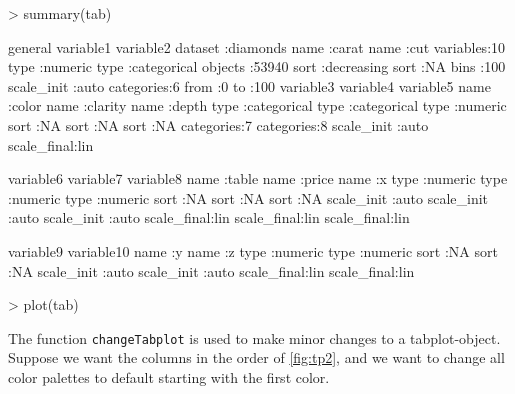 \documentclass[11pt, fleqn, a4paper]{article}
\begin{document}
\begin{Schunk}
\begin{Sinput}
> summary(tab)
\end{Sinput}
\begin{Soutput}
      general               variable1               variable2          
 dataset  :diamonds   name       :carat        name      :cut          
 variables:10         type       :numeric      type      :categorical  
 objects  :53940      sort       :decreasing   sort      :NA           
 bins     :100        scale_init :auto         categories:6            
 from     :0%         scale_final:lin                                  
 to       :100%                                                        
      variable3                variable4                 variable5      
 name      :color         name      :clarity       name       :depth    
 type      :categorical   type      :categorical   type       :numeric  
 sort      :NA            sort      :NA            sort       :NA       
 categories:7             categories:8             scale_init :auto     
                                                   scale_final:lin      
                                                                        
       variable6             variable7             variable8      
 name       :table     name       :price     name       :x        
 type       :numeric   type       :numeric   type       :numeric  
 sort       :NA        sort       :NA        sort       :NA       
 scale_init :auto      scale_init :auto      scale_init :auto     
 scale_final:lin       scale_final:lin       scale_final:lin      
                                                                  
       variable9             variable10     
 name       :y         name       :z        
 type       :numeric   type       :numeric  
 sort       :NA        sort       :NA       
 scale_init :auto      scale_init :auto     
 scale_final:lin       scale_final:lin      
\end{Soutput}
\begin{Sinput}
> plot(tab)
\end{Sinput}
\end{Schunk}

The function {\tt changeTabplot} is used to make minor changes to a tabplot-object. Suppose we want the columns in the order of \ref{fig:tp2}, and we want to change all color palettes to default starting with the first color.
\end{document}
